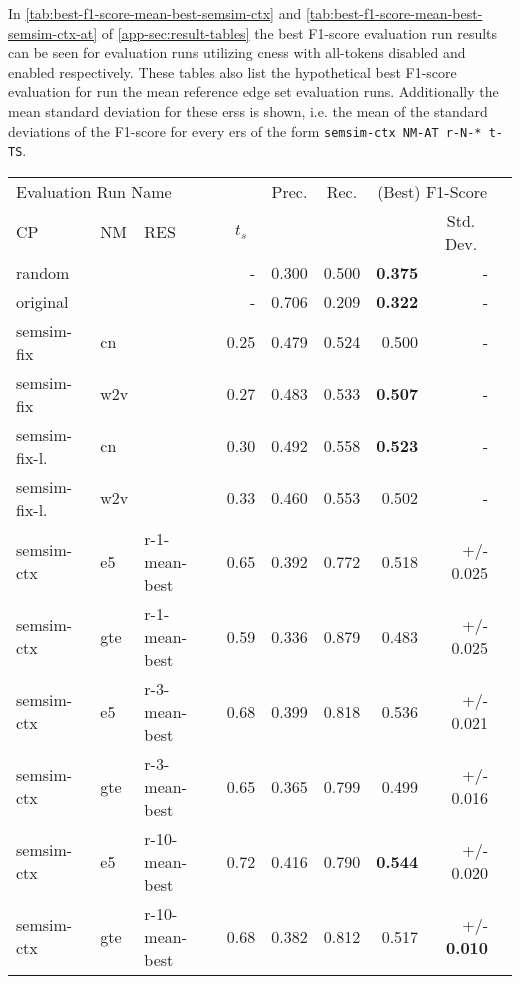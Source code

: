 \documentclass[11pt]{scrreprt}
\begin{document}
{In \cref{tab:best-f1-score-mean-best-semsim-ctx} and \cref{tab:best-f1-score-mean-best-semsim-ctx-at} of \cref{app-sec:result-tables} the best F1-score evaluation run results can be seen for evaluation runs utilizing \gls{cness} with all-tokens disabled and enabled respectively. These tables also list the hypothetical best F1-score evaluation for run the mean reference edge set evaluation runs. Additionally the mean standard deviation for these \gls{ers}s is shown, i.e. the mean of the standard deviations of the F1-score for every \gls{ers} of the form \texttt{semsim-ctx NM-AT r-N-* t-TS}.

\begin{table}[htp]
\centering
\begin{tabular}{lllrrrrrr}
\toprule
\multicolumn{4}{l}{Evaluation Run Name} & \multicolumn{1}{c}{Prec.} & \multicolumn{1}{c}{Rec.} & \multicolumn{2}{c}{(Best) F1-Score}\\
\cmidrule{1-4}\cmidrule{7-8}
\multicolumn{1}{l}{CP} & \multicolumn{1}{l}{NM} & \multicolumn{1}{l}{RES} & \multicolumn{1}{c}{\(t_s\)} & \multicolumn{3}{l}{} & \multicolumn{1}{c}{Std. Dev.} \\
\midrule
random &  &  & - & 0.300 & 0.500 & \textbf{0.375} & - \\
\hline
original &  &  & - & 0.706 & 0.209 & \textbf{0.322} & - \\
\hline
semsim-fix & cn &  & 0.25 & 0.479 & 0.524 & 0.500 & - \\
semsim-fix & w2v &  & 0.27 & 0.483 & 0.533 & \textbf{0.507} & - \\
\hline
semsim-fix-l. & cn &  & 0.30 & 0.492 & 0.558 & \textbf{0.523} & - \\
semsim-fix-l. & w2v &  & 0.33 & 0.460 & 0.553 & 0.502 & - \\
\hline
semsim-ctx & e5 & r-1-mean-best & 0.65 & 0.392 & 0.772 & 0.518 & +/- 0.025 \\
semsim-ctx & gte & r-1-mean-best & 0.59 & 0.336 & 0.879 & 0.483 & +/- 0.025 \\
semsim-ctx & e5 & r-3-mean-best & 0.68 & 0.399 & 0.818 & 0.536 & +/- 0.021 \\
semsim-ctx & gte & r-3-mean-best & 0.65 & 0.365 & 0.799 & 0.499 & +/- 0.016 \\
semsim-ctx & e5 & r-10-mean-best & 0.72 & 0.416 & 0.790 & \textbf{0.544} & +/- 0.020 \\
semsim-ctx & gte & r-10-mean-best & 0.68 & 0.382 & 0.812 & 0.517 & +/- \textbf{0.010} \\


\end{tabular}
\end{table}}
\end{document}
